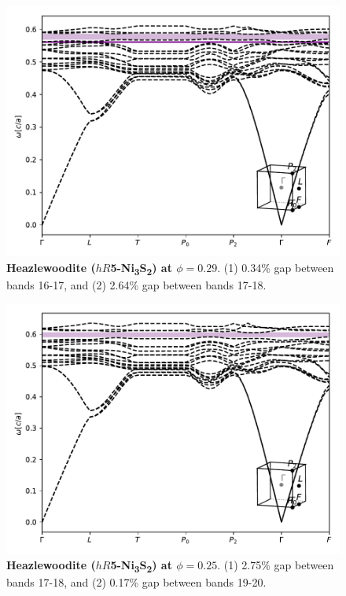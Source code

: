 \documentclass[fleqn,amsmath,amssymb,superscriptaddress, reprint,prl]{revtex4-1}
\begin{document}
\begin{figure}
\includegraphics[width=0.9\linewidth]{workspace/419ab150d81de4e637b0c6c09e744e0a/images/r=24.pdf}
	\caption{\textbf{Heazlewoodite ($hR$5-Ni\textsubscript{3}S\textsubscript{2}) at $\phi=0.29$}. (1) 0.34\% gap between bands 16-17, and (2) 2.64\% gap between bands 17-18.}
\end{figure}

\begin{figure}
\includegraphics[width=0.9\linewidth]{workspace/419ab150d81de4e637b0c6c09e744e0a/images/r=23.pdf}
	\caption{\textbf{Heazlewoodite ($hR$5-Ni\textsubscript{3}S\textsubscript{2}) at $\phi=0.25$}. (1) 2.75\% gap between bands 17-18, and (2) 0.17\% gap between bands 19-20.}
\end{figure}
\end{document}
